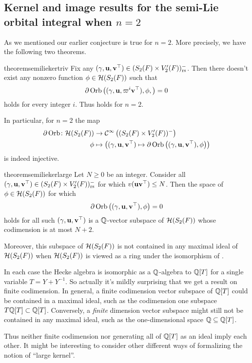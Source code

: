 \subsection{Kernel and image results for the semi-Lie orbital integral when $n=2$}
As we mentioned our earlier conjecture 
is true for $n = 2$.
More precisely, we have the following two theorems.

\begin{restatable}{theorem}{semiliekertriv}
  \label{thm:semi_lie_ker_trivial}
  Fix any ${(\gamma, \mathbf u, \mathbf v^\top)} \in (S_2(F) \times V'_2(F))_{\mathrm{rs}}^-$.
  Then there doesn't exist any nonzero function $\phi \in \mathcal H(S_2(F))$ such that
  \[ \partial \operatorname{Orb} \left( (\gamma, \mathbf u, \varpi^i \mathbf v^\top), \phi, \right) = 0 \]
  holds for every integer $i$.
  Thus  holds for $n = 2$.
\end{restatable}

In particular, for $n=2$ the map
\begin{align*}
  \partial\operatorname{Orb} \colon \mathcal H(S_2(F)) &\to \mathcal{C}^\infty\left( (S_2(F) \times V'_2(F))^- \right) \\
  \phi &\mapsto \left( {(\gamma, \mathbf u, \mathbf v^\top)} \mapsto \partial \operatorname{Orb} \left({(\gamma, \mathbf u, \mathbf v^\top)}, \phi \right) \right)
\end{align*}
is indeed injective.

\begin{restatable}{theorem}{semiliekerlarge}
  \label{thm:semi_lie_ker_huge}
  Let $N \ge 0$ be an integer.
  Consider all ${(\gamma, \mathbf u, \mathbf v^\top)} \in (S_2(F) \times V'_2(F))_{\mathrm{rs}}^-$ for which $v(\mathbf u\mathbf v^\top) \le N$.
  Then the space of $\phi \in \mathcal H(S_2(F))$ for which
  \[ \partial \operatorname{Orb} \left( {(\gamma, \mathbf u, \mathbf v^\top)}, \phi \right) = 0 \]
  holds for all such ${(\gamma, \mathbf u, \mathbf v^\top)}$ is a $\mathbb Q$-vector subspace of $\mathcal H(S_2(F))$
  whose codimension is at most $N + 2$.

  Moreover, this subspace of $\mathcal H(S_2(F))$
  is not contained in any maximal ideal of $\mathcal H(S_2(F))$
  when $\mathcal H(S_2(F))$ is viewed as a ring under the isomorphism of .
\end{restatable}

\begin{remark}
  In each case the Hecke algebra is isomorphic as a $\mathbb Q$-algebra to $\mathbb Q[T]$
  for a single variable $T = Y+Y^{-1}$.
  So actually it's mildly surprising that we get a result on finite codimension.
  In general, a finite codimension vector subspace of $\mathbb Q[T]$ could
  be contained in a maximal ideal,
  such as the codimension one subspace $T \mathbb Q[T] \subset \mathbb Q[T]$.
  Conversely, a \emph{finite} dimension vector subspace might still
  not be contained in any maximal ideal,
  such as the one-dimensional space $\mathbb Q \subseteq \mathbb Q[T]$.

  Thus neither finite codimension nor generating all of $\mathbb Q[T]$ as an ideal imply each other.
  It might be interesting to consider other different ways
  of formalizing the notion of ``large kernel''.
\end{remark}

